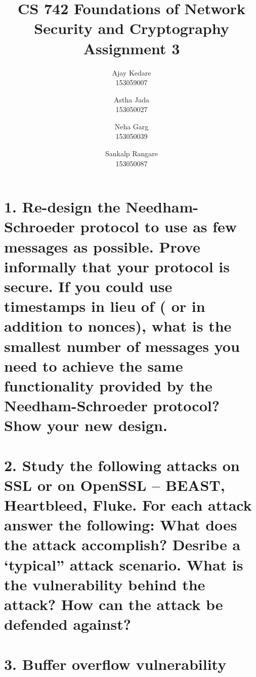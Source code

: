 \documentclass{article}
\title{CS 742 Foundations of Network Security and Cryptography \\ Assignment 3}
\author{
  Ajay Kedare \\
  153059007
  \and
  Astha Jada \\
  153050027
  \and
  Neha Garg \\
  153050039
  \and
  Sankalp Rangare \\
  153050087
}
\begin{document}
\maketitle
\clearpage

\section*{1. Re-design the Needham-Schroeder protocol to use as few messages as possible. Prove
informally that your protocol is secure.
If you could use timestamps in lieu of ( or in addition to nonces), what is the smallest
number of messages you need to achieve the same functionality provided by the
Needham-Schroeder protocol? Show your new design.}


\section*{2. Study the following attacks on SSL or on OpenSSL – BEAST, Heartbleed, Fluke. For each
attack answer the following:
What does the attack accomplish?
Desribe a ‘typical” attack scenario.
What is the vulnerability behind the attack?
How can the attack be defended against?}

\section*{3. Buffer overflow vulnerability}
\end{document}
